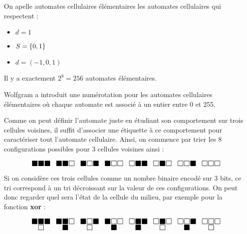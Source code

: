 \begin{definition}

	On apelle automates cellulaires élémentaires les automates cellulaires qui respectent :
	\begin{itemize}
		\item $d = 1$
		\item $S = \left\{0,1\right\}$
		\item $d = (-1,0,1)$
	\end{itemize}

	Il y a exactement $2^8 = 256$ automates élémentaires.
\end{definition}

\begin{notation}
	Wolfgram a introduit une numérotation \cite{wolfgramClass} pour les automates cellulaires élémentaires où chaque automate
	est associé à un entier entre 0 et 255.

	Comme on peut définir l'automate juste en étudiant son comportement sur trois cellules voisines, il suffit d'associer une
	étiquette à ce comportement pour caractériser tout l'automate cellulaire. Ainsi, on commence par trier
	les 8 configurations possibles pour 3 cellules voisines ainsi :

	\[ \LARGE
		\substack{\blacksquare \blacksquare \blacksquare } \enspace
		\substack{\blacksquare \blacksquare \square } \enspace
		\substack{\blacksquare \square \blacksquare } \enspace
		\substack{\blacksquare \square \square } \enspace
		\substack{\square \blacksquare \blacksquare } \enspace
		\substack{\square \blacksquare \square } \enspace
		\substack{\square \square \blacksquare } \enspace
		\substack{\square \square \square }
	\]

	Si on considère ces trois cellules comme un nombre binaire encodé sur 3 bits, ce tri correspond à un tri décroissant sur la
	valeur de ces configurations. On peut donc regarder quel sera l'état de la cellule du milieu, par exemple pour la
	fonction \textbf{xor} :


	\[ \LARGE
		\substack{\blacksquare \blacksquare \blacksquare \\ \square } \enspace
		\substack{\blacksquare \blacksquare \square \\ \blacksquare} \enspace
		\substack{\blacksquare \square \blacksquare \\ \square} \enspace
		\substack{\blacksquare \square \square \\ \blacksquare} \enspace
		\substack{\square \blacksquare \blacksquare \\ \blacksquare} \enspace
		\substack{\square \blacksquare \square \\ \square} \enspace
		\substack{\square \square \blacksquare \\ \blacksquare} \enspace
		\substack{\square \square \square \\ \square}
	\]


\end{notation}
